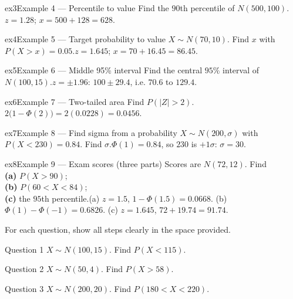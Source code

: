 \documentclass[11pt]{article}
\begin{document}
\begin{example}{ex3}{Example 4 --- Percentile to value}
Find the $90$th percentile of $N(500,100)$.\soln $z=1.28$; $x=500+128=628$.
\end{example}

\begin{example}{ex4}{Example 5 --- Target probability to value}
$X\sim N(70,10)$. Find $x$ with $P(X>x)=0.05$.\soln $z=1.645$; $x=70+16.45=86.45$.
\end{example}

\begin{example}{ex5}{Example 6 --- Middle 95\% interval}
Find the central $95\%$ interval of $N(100,15)$.\soln $z=\pm1.96$: $100\pm29.4$, i.e. $70.6$ to $129.4$.
\end{example}

\begin{example}{ex6}{Example 7 --- Two-tailed area}
Find $P(|Z|>2)$.\soln $2\bigl(1-\Phi(2)\bigr)=2(0.0228)=0.0456$.
\end{example}

\begin{example}{ex7}{Example 8 --- Find sigma from a probability}
$X\sim N(200,\sigma)$ with $P(X<230)=0.84$. Find $\sigma$.\soln $\Phi(1)=0.84$, so $230$ is $+1\sigma$: $\sigma=30$.
\end{example}

\begin{example}{ex8}{Example 9 --- Exam scores (three parts)}
Scores are $N(72,12)$. Find \\ \textbf{(a)} $P(X>90)$; \\ \textbf{(b)} $P(60<X<84)$; \\ \textbf{(c)} the $95$th percentile.\soln (a) $z=1.5$, $1-\Phi(1.5)=0.0668$. (b) $\Phi(1)-\Phi(-1)=0.6826$. (c) $z=1.645$, $72+19.74=91.74$.
\end{example}

\clearpage
{}
For each question, show all steps clearly in the space provided.

\begin{qbox}{Question 1}
$X\sim N(100,15)$. Find $P(X<115)$.\workspace{2.4cm}
\end{qbox}

\begin{qbox}{Question 2}
$X\sim N(50,4)$. Find $P(X>58)$.\workspace{2.4cm}
\end{qbox}

\begin{qbox}{Question 3}
$X\sim N(200,20)$. Find $P(180<X<220)$.\workspace{2.4cm}
\end{qbox}
\end{document}
